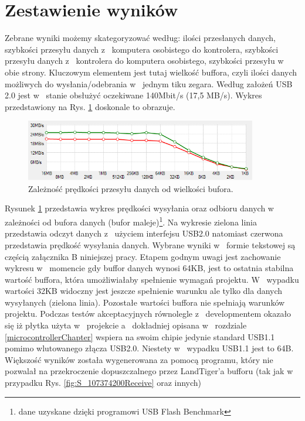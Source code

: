 \documentclass{BscUS}
\begin{document}
\section{Zestawienie wyników}
\indent Zebrane wyniki możemy skategoryzować według: ilości przesłanych danych, szybkości przesyłu danych z~ komputera osobistego do kontrolera, szybkości przesyłu danych z~ kontrolera do komputera osobistego, szybkości przesyłu w~ obie strony. Kluczowym elementem jest tutaj wielkość buffora, czyli ilości danych możliwych do wysłania/odebrania w~ jednym tiku zegara.
\newline
\indent Według założeń USB 2.0 jest w~ stanie obsłużyć oczekiwane 140Mbit/s (17,5 MB/s). Wykres przedstawiony na Rys. \ref{fig:speedTest} doskonale to obrazuje.
\begin{figure}[H]
\centering
\includegraphics[width=0.9\textwidth]{./img/speedTest}
\caption{Zależność prędkości przesyłu danych od wielkości bufora.}
\label{fig:speedTest}
\end{figure}
Rysunek \ref{fig:speedTest} przedstawia wykres prędkości wysyłania oraz odbioru danych w~ zależności od bufora danych (bufor maleje)\footnote{dane uzyskane dzięki programowi USB Flash Benchmark\cite{USBFlashBenchmark}}. Na wykresie zielona linia przedstawia odczyt danych z~ użyciem interfejsu USB2.0 natomiast czerwona przedstawia prędkość wysyłania danych. Wybrane wyniki w~ formie tekstowej są częścią załącznika B niniejszej pracy. Etapem godnym uwagi jest zachowanie wykresu w~ momencie gdy buffor danych wynosi 64KB, jest to ostatnia stabilna wartość buffora, która umożliwiałaby spełnienie wymagań projektu. W~ wypadku wartości 32KB widoczny jest jeszcze spełnienie warunku ale tylko dla danych wysyłanych (zielona linia). Pozostałe wartości buffora nie spełniają warunków projektu.
\newline
\indent Podczas testów akceptacyjnych równolegle z~ developmentem okazało się iż płytka użyta w~ projekcie a~ dokładniej opisana w~ rozdziale \ref{microcontrollerChapter} wspiera na swoim chipie jedynie standard USB1.1 pomimo wlutowanego złącza USB2.0. Niestety w~ wypadku USB1.1 jest to 64B. Większość wyników została wygenerowana za pomocą programu, który nie pozwalał na przekroczenie dopuszczalnego przez LandTiger'a bufforu (tak jak w~ przypadku Rys. \ref{fig:S_107374200Receive} oraz innych)
\end{document}
